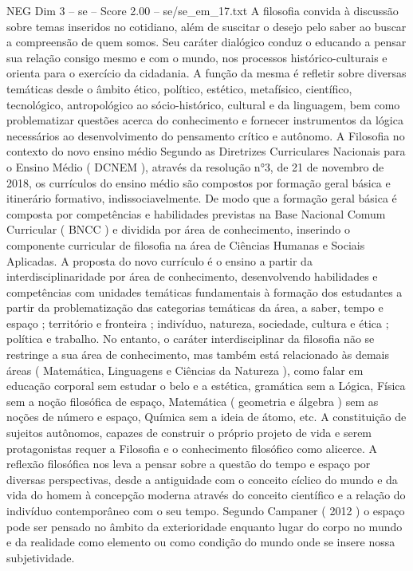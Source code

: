\begin{textsample}{NEG Dim 3 – se – Score 2.00 – se/se\_em\_17.txt}
A filosofia convida à discussão sobre temas inseridos no cotidiano, além de suscitar o desejo pelo saber ao buscar a compreensão de quem somos.
Seu caráter dialógico conduz o educando a pensar sua relação consigo mesmo e com o mundo, nos processos histórico-culturais e orienta para o exercício da cidadania.
A função da mesma é refletir sobre diversas temáticas desde o âmbito ético, político, estético, metafísico, científico, tecnológico, antropológico ao sócio-histórico, cultural e da linguagem, bem como problematizar questões acerca do conhecimento e fornecer instrumentos da lógica necessários ao desenvolvimento do pensamento crítico e autônomo.
A Filosofia no contexto do novo ensino médio Segundo as Diretrizes Curriculares Nacionais para o Ensino Médio ( DCNEM ), através da resolução n{\EmojiFont °}3, de 21 de novembro de 2018, os currículos do ensino médio são compostos por formação geral básica e itinerário formativo, indissociavelmente.
De modo que a formação geral básica é composta por competências e habilidades previstas na Base Nacional Comum Curricular ( BNCC ) e dividida por área de conhecimento, inserindo o componente curricular de filosofia na área de Ciências Humanas e Sociais Aplicadas.
A proposta do novo currículo é o ensino a partir da interdisciplinaridade por área de conhecimento, desenvolvendo habilidades e competências com unidades temáticas fundamentais à formação dos estudantes a partir da problematização das categorias temáticas da área, a saber, tempo e espaço ; território e fronteira ; indivíduo, natureza, sociedade, cultura e ética ; política e trabalho.
No entanto, o caráter interdisciplinar da filosofia não se restringe a sua área de conhecimento, mas também está relacionado às demais áreas ( Matemática, Linguagens e Ciências da Natureza ), como falar em educação corporal sem estudar o belo e a estética, gramática sem a Lógica, Física sem a noção filosófica de espaço, Matemática ( geometria e álgebra ) sem as noções de número e espaço, Química sem a ideia de átomo, etc.
A constituição de sujeitos autônomos, capazes de construir o próprio projeto de vida e serem protagonistas requer a Filosofia e o conhecimento filosófico como alicerce.
A reflexão filosófica nos leva a pensar sobre a questão do tempo e espaço por diversas perspectivas, desde a antiguidade com o conceito cíclico do mundo e da vida do homem à concepção moderna através do conceito científico e a relação do indivíduo contemporâneo com o seu tempo.
Segundo Campaner ( 2012 ) o espaço pode ser pensado no âmbito da exterioridade enquanto lugar do corpo no mundo e da realidade como elemento ou como condição do mundo onde se insere nossa subjetividade.

\end{textsample}
